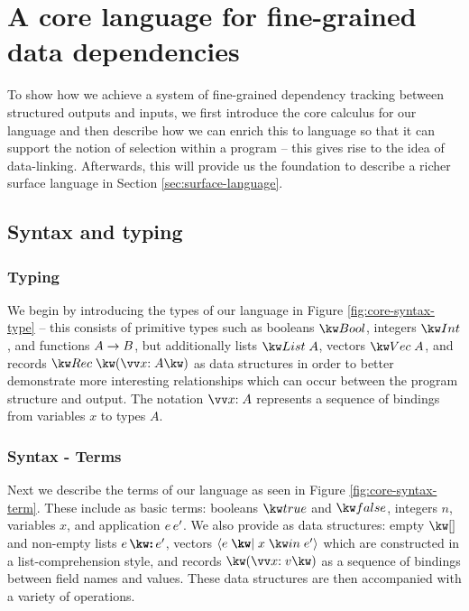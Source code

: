 \newpage

\section{A core language for fine-grained data dependencies}
\label{sec:core-language}

To show how we achieve a system of fine-grained dependency tracking between structured outputs and inputs, we first introduce the core calculus for our language and then describe how we can enrich this to language so that it can support the notion of selection within a program -- this gives rise to the idea of data-linking. Afterwards, this will provide us the foundation to describe a richer surface language in Section \ref{sec:surface-language}.

\subsection{Syntax and typing}

\subsubsection{Typing}
We begin by introducing the types of our language in Figure \ref{fig:core-syntax-type} -- this consists of primitive types such as booleans $\tyBool$, integers $\tyInt$, and functions ${A}\rightarrow{B}$, but additionally lists $\tyList{A}$, vectors $\tyVec{A}$, and records $\tyRec{\vec{\bind{x}{A}}}$ as data structures in order to better demonstrate more interesting relationships which can occur between the program structure and output. The notation $\seq{\bind{x}{A}}$  represents a sequence of bindings from variables $x$ to types $A$.



\subsubsection{Syntax - Terms}
Next we describe the terms of our language as seen in Figure \ref{fig:core-syntax-term}.  These include as basic terms: booleans $\exTrue$ and $\exFalse$, integers $n$, variables $x$, and application ${e}\,{e'}$. We also provide as data structures: empty $\exNil$ and non-empty lists $\exCons{e}{e'}$, vectors $\exVec{e}{x}{e'}$ which are constructed in a list-comprehension style, and records $\exRec{\vec{\bind{x}{v}}}$ as a sequence of bindings between field names and values. These data structures are then accompanied with a variety of operations. 

